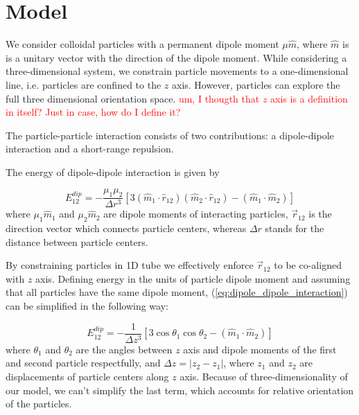 \section{Model}

We consider colloidal particles with a permanent dipole moment $\mu \hat{m}$, where $\hat{m}$ is is a unitary vector with the direction of the dipole moment. While considering a three-dimensional system, we constrain particle movements to a one-dimensional line, i.e. particles are confined to the $z$ axis. However, particles can explore the full three dimensional orientation space. \textcolor{red}{um, I thougth that $z$ axis is a definition in itself? Just in case, how do I define it?}

The particle-particle interaction consists of two contributions: a dipole-dipole interaction and a short-range repulsion.

The energy of dipole-dipole interaction is given by

\label{eq:dipole_dipole_interaction}
\begin{equation}
E^{dip}_{12} = - \frac{\mu_1 \mu_2}{\Delta r^3}[3 (\hat{m}_1 \cdot \hat{r}_{12})(\hat{m}_2 \cdot \hat{r}_{12}) - (\hat{m}_1 \cdot \hat{m}_2)]
\end{equation}
where $\mu_1 \hat{m}_1$ and $\mu_2 \hat{m}_2$ are dipole moments of interacting particles, $\vec{r}_{12}$ is the direction vector which connects particle centers, whereas $\Delta r$ stands for the distance between particle centers.

By constraining particles in 1D tube we effectively enforce $\vec{r}_{12}$ to be co-aligned with $z$ axis. Defining energy in the units of particle dipole moment and assuming that all particles have the same dipole moment, (\ref{eq:dipole_dipole_interaction}) can be simplified in the following way:

\label{eq_dipole_dipole_1D}
\begin{equation}
E_{12}^{dip} = - \frac{1}{\Delta z^3} [3 \cos \theta_1 \cos \theta_2 - (\hat{m}_1 \cdot \hat{m}_2)]
\end{equation}
where $\theta_1$ and $\theta_2$ are the angles between $z$ axis and dipole moments of the first and second particle respectfully, and $\Delta z = |z_2 - z_1|$, where $z_1$ and $z_2$ are displacements of particle centers along $z$ axis. Because of three-dimensionality of our model, we can't simplify the last term, which accounts for relative orientation of the particles.

